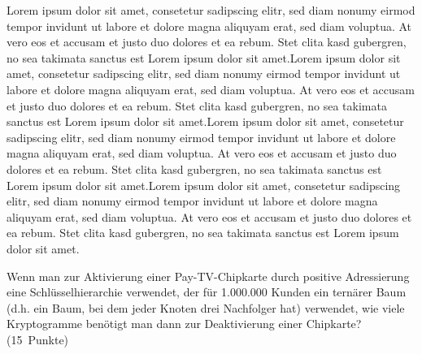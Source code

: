 \documentclass[addpoints,a4paper,ngerman,10pt,answers]{exam}
\begin{document}
\begin{questions}
\ifprintanswers
\begin{minipage}{0.7\textwidth}
\begin{solution}
\parbox[t][][t]{0.8\textwidth}{Lorem ipsum dolor sit amet, consetetur sadipscing elitr, sed diam nonumy eirmod tempor invidunt ut labore et dolore magna aliquyam erat, sed diam voluptua. At vero eos et accusam et justo duo dolores et ea rebum. Stet clita kasd gubergren, no sea takimata sanctus est Lorem ipsum dolor sit amet.Lorem ipsum dolor sit amet, consetetur sadipscing elitr, sed diam nonumy eirmod tempor invidunt ut labore et dolore magna aliquyam erat, sed diam voluptua. At vero eos et accusam et justo duo dolores et ea rebum. Stet clita kasd gubergren, no sea takimata sanctus est Lorem ipsum dolor sit amet.Lorem ipsum dolor sit amet, consetetur sadipscing elitr, sed diam nonumy eirmod tempor invidunt ut labore et dolore magna aliquyam erat, sed diam voluptua. At vero eos et accusam et justo duo dolores et ea rebum. Stet clita kasd gubergren, no sea takimata sanctus est Lorem ipsum dolor sit amet.Lorem ipsum dolor sit amet, consetetur sadipscing elitr, sed diam nonumy eirmod tempor invidunt ut labore et dolore magna aliquyam erat, sed diam voluptua. At vero eos et accusam et justo duo dolores et ea rebum. Stet clita kasd gubergren, no sea takimata sanctus est Lorem ipsum dolor sit amet.}
\end{solution}
\end{minipage}
\else
{}
\fi
\vspace{1cm}
\question[15] \parbox[t][][t]{0.68\textwidth}{Wenn man zur Aktivierung einer Pay-TV-Chipkarte durch positive Adressierung eine
Schlüsselhierarchie verwendet, der für 1.000.000 Kunden ein ternärer Baum (d.h. ein Baum, bei
dem jeder Knoten drei Nachfolger hat) verwendet, wie viele Kryptogramme benötigt man dann zur
Deaktivierung einer Chipkarte? 
\linebreak(15\ Punkte)}


\end{questions}
\end{document}
